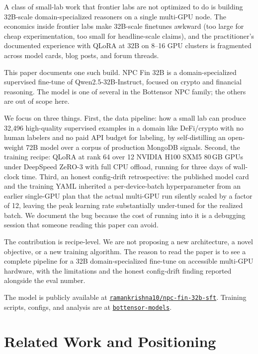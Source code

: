 \documentclass[10pt,letterpaper]{article}
\begin{document}
A class of small-lab work that frontier labs are not optimized to do is building 32B-scale domain-specialized reasoners on a single multi-GPU node. The economics inside frontier labs make 32B-scale finetunes awkward (too large for cheap experimentation, too small for headline-scale claims), and the practitioner's documented experience with QLoRA at 32B on 8--16 GPU clusters is fragmented across model cards, blog posts, and forum threads.

This paper documents one such build. NPC Fin 32B is a domain-specialized supervised fine-tune of Qwen2.5-32B-Instruct, focused on crypto and financial reasoning. The model is one of several in the Bottensor NPC family; the others are out of scope here.

We focus on three things. First, the data pipeline: how a small lab can produce 32{,}496 high-quality supervised examples in a domain like DeFi/crypto with no human labelers and no paid API budget for labeling, by self-distilling an open-weight 72B model over a corpus of production MongoDB signals. Second, the training recipe: QLoRA at rank 64 over 12 NVIDIA H100 SXM5 80\,GB GPUs under DeepSpeed ZeRO-3 with full CPU offload, running for three days of wall-clock time. Third, an honest config-drift retrospective: the published model card and the training YAML inherited a per-device-batch hyperparameter from an earlier single-GPU plan that the actual multi-GPU run silently scaled by a factor of 12, leaving the peak learning rate substantially under-tuned for the realized batch. We document the bug because the cost of running into it is a debugging session that someone reading this paper can avoid.

The contribution is recipe-level. We are not proposing a new architecture, a novel objective, or a new training algorithm. The reason to read the paper is to see a complete pipeline for a 32B domain-specialized fine-tune on accessible multi-GPU hardware, with the limitations and the honest config-drift finding reported alongside the eval number.

The model is publicly available at \href{https://huggingface.co/ramankrishna10/npc-fin-32b-sft}{\texttt{ramankrishna10/npc-fin-32b-sft}}. Training scripts, configs, and analysis are at \href{https://github.com/ramankrishna/bottensor-models/tree/main/training/npc-fin-32b}{\texttt{bottensor-models}}.

\section{Related Work and Positioning}
\label{sec:related}
\end{document}
